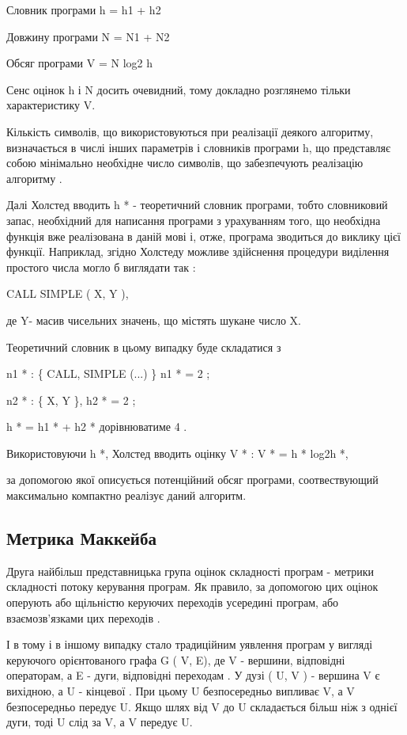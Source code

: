Словник програми h = h1 + h2

Довжину програми N = N1 + N2

Обсяг програми V = N log2 h

Сенс оцінок h і N досить очевидний, тому докладно розглянемо тільки характеристику V.

Кількість символів, що використовуються при реалізації деякого алгоритму, визначається в числі інших параметрів і словників програми h, що представляє собою мінімально необхідне число символів, що забезпечують реалізацію алгоритму .

Далі Холстед вводить h * - теоретичний словник програми, тобто словниковий запас, необхідний для написання програми з урахуванням того, що необхідна функція вже реалізована в даній мові і, отже, програма зводиться до виклику цієї функції. Наприклад, згідно Холстеду можливе здійснення процедури виділення простого числа могло б виглядати так :

CALL SIMPLE ( X, Y ),

де Y- масив чисельних значень, що містять шукане число X.

Теоретичний словник в цьому випадку буде складатися з

n1 * : \{ CALL, SIMPLE (...) \} n1 * = 2 ;

n2 * : \{ X, Y \}, h2 * = 2 ;

h * = h1 * + h2 * дорівнюватиме 4 .

Використовуючи h *, Холстед вводить оцінку V * : V * = h * log2h *,

за допомогою якої описується потенційний обсяг програми, соотвествующий максимально компактно реалізує даний алгоритм.


\subsection{Метрика Маккейба}
\label{2section:id11}
Друга найбільш представницька група оцінок складності програм - метрики складності потоку керування програм. Як правило, за допомогою цих оцінок оперують або щільністю керуючих переходів усередині програм, або взаємозв'язками цих переходів .

І в тому і в іншому випадку стало традиційним уявлення програм у вигляді керуючого орієнтованого графа G ( V, E), де V - вершини, відповідні операторам, а E - дуги, відповідні переходам . У дузі ( U, V ) - вершина V є вихідною, а U - кінцевої . При цьому U безпосередньо випливає V, а V безпосередньо передує U. Якщо шлях від V до U складається більш ніж з однієї дуги, тоді U слід за V, а V передує U.


